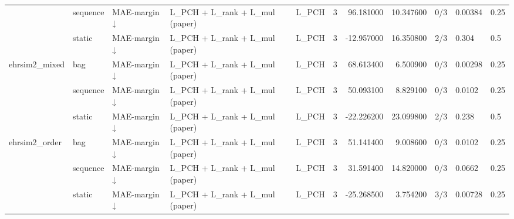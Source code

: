 \begin{tabular}{lllllrrrlll}
\cline{2-11} \cline{3-11}
 & sequence & MAE-margin ↓ & L\_PCH + L\_rank + L\_mul (paper) & L\_PCH & 3 & 96.181000 & 10.347600 & 0/3 & 0.00384 & 0.25 \\
\cline{2-11} \cline{3-11}
 & static & MAE-margin ↓ & L\_PCH + L\_rank + L\_mul (paper) & L\_PCH & 3 & -12.957000 & 16.350800 & 2/3 & 0.304 & 0.5 \\
\cline{1-11} \cline{2-11} \cline{3-11}
\multirow[t]{3}{*}{ehrsim2\_mixed} & bag & MAE-margin ↓ & L\_PCH + L\_rank + L\_mul (paper) & L\_PCH & 3 & 68.613400 & 6.500900 & 0/3 & 0.00298 & 0.25 \\
\cline{2-11} \cline{3-11}
 & sequence & MAE-margin ↓ & L\_PCH + L\_rank + L\_mul (paper) & L\_PCH & 3 & 50.093100 & 8.829100 & 0/3 & 0.0102 & 0.25 \\
\cline{2-11} \cline{3-11}
 & static & MAE-margin ↓ & L\_PCH + L\_rank + L\_mul (paper) & L\_PCH & 3 & -22.226200 & 23.099800 & 2/3 & 0.238 & 0.5 \\
\cline{1-11} \cline{2-11} \cline{3-11}
\multirow[t]{3}{*}{ehrsim2\_order} & bag & MAE-margin ↓ & L\_PCH + L\_rank + L\_mul (paper) & L\_PCH & 3 & 51.141400 & 9.008600 & 0/3 & 0.0102 & 0.25 \\
\cline{2-11} \cline{3-11}
 & sequence & MAE-margin ↓ & L\_PCH + L\_rank + L\_mul (paper) & L\_PCH & 3 & 31.591400 & 14.820000 & 0/3 & 0.0662 & 0.25 \\
\cline{2-11} \cline{3-11}
 & static & MAE-margin ↓ & L\_PCH + L\_rank + L\_mul (paper) & L\_PCH & 3 & -25.268500 & 3.754200 & 3/3 & 0.00728 & 0.25 \\
\cline{1-11} \cline{2-11} \cline{3-11}
\bottomrule
\end{tabular}
